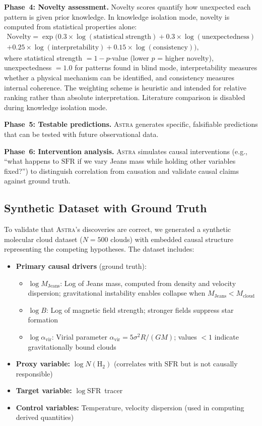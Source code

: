 \documentclass[fleqn,usenatbib]{mnras}
\newcommand{\astra}{\textsc{Astra}\xspace}
\newcommand{\sfr}{\mathrm{SFR}}
\newcommand{\nh}{N(\mathrm{H}_2)}
\begin{document}
\textbf{Phase~4: Novelty assessment.}
Novelty scores quantify how unexpected each pattern is given prior knowledge.
In knowledge isolation mode, novelty is computed from statistical properties alone:
\begin{multline}
  \mathrm{Novelty} = \exp\bigl(0.3 \times \log(\mathrm{statistical\;strength}) + 0.3 \times \log(\mathrm{unexpectedness}) \\
  + 0.25 \times \log(\mathrm{interpretability}) + 0.15 \times \log(\mathrm{consistency})\bigr),
  \label{eq:novelty}
\end{multline}
where statistical strength $= 1 - p$-value (lower $p$ = higher novelty), unexpectedness $= 1.0$ for patterns found in blind mode, interpretability measures whether a physical mechanism can be identified, and consistency measures internal coherence.
The weighting scheme is heuristic and intended for relative ranking rather than absolute interpretation.
Literature comparison is disabled during knowledge isolation mode.

\textbf{Phase~5: Testable predictions.}
\astra generates specific, falsifiable predictions that can be tested with future observational data.

\textbf{Phase~6: Intervention analysis.}
\astra simulates causal interventions (e.g., ``what happens to $\sfr$ if we vary Jeans mass while holding other variables fixed?'') to distinguish correlation from causation and validate causal claims against ground truth.

\subsection{Synthetic Dataset with Ground Truth}
\label{sec:tc6:dataset}

To validate that \astra's discoveries are correct, we generated a synthetic molecular cloud dataset ($N = 500$ clouds) with embedded causal structure representing the competing hypotheses.
The dataset includes:
\begin{itemize}
  \item \textbf{Primary causal drivers} (ground truth):
  \begin{itemize}
    \item $\log M_{\mathrm{Jeans}}$: Log of Jeans mass, computed from density and velocity dispersion; gravitational instability enables collapse when $M_{\mathrm{Jeans}} < M_{\mathrm{cloud}}$
    \item $\log B$: Log of magnetic field strength; stronger fields suppress star formation
    \item $\log \alpha_{\mathrm{vir}}$: Virial parameter $\alpha_{\mathrm{vir}} = 5\sigma^2 R / (GM)$; values $<1$ indicate gravitationally bound clouds
  \end{itemize}
  \item \textbf{Proxy variable:} $\log \nh$ (correlates with $\sfr$ but is not causally responsible)
  \item \textbf{Target variable:} $\log \sfr$~tracer
  \item \textbf{Control variables:} Temperature, velocity dispersion (used in computing derived quantities)
\end{itemize}
\end{document}
